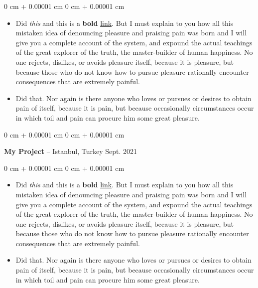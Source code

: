 \documentclass[10pt, letterpaper]{article}
\newenvironment{highlights}{
    \begin{itemize}[
        topsep=0.10 cm,
        parsep=0.10 cm,
        partopsep=0pt,
        itemsep=0pt,
        leftmargin=0 cm + 10pt
    ]
}{
    \end{itemize}
} %
\newenvironment{onecolentry}{
    \begin{adjustwidth}{
        0 cm + 0.00001 cm
    }{
        0 cm + 0.00001 cm
    }
}{
    \end{adjustwidth}
} %
\newenvironment{twocolentry}[2][]{
    \onecolentry
    \def\secondColumn{#2}
    \setcolumnwidth{\fill, 4.5 cm}
    \begin{paracol}{2}
}{
    \switchcolumn \raggedleft \secondColumn
    \end{paracol}
    \endonecolentry
} %
\begin{document}
        \vspace{0.10 cm}
        \begin{onecolentry}
            \begin{highlights}
                \item Did \textit{this} and this is a \textbf{bold} \href{https://example.com}{link}. But I must explain to you how all this mistaken idea of denouncing pleasure and praising pain was born and I will give you a complete account of the system, and expound the actual teachings of the great explorer of the truth, the master-builder of human happiness. No one rejects, dislikes, or avoids pleasure itself, because it is pleasure, but because those who do not know how to pursue pleasure rationally encounter consequences that are extremely painful.
                \item Did that. Nor again is there anyone who loves or pursues or desires to obtain pain of itself, because it is pain, but because occasionally circumstances occur in which toil and pain can procure him some great pleasure.
            \end{highlights}
        \end{onecolentry}


        \vspace{0.2 cm}

        \begin{twocolentry}{
            Sept. 2021
        }
            \textbf{My Project} -- Istanbul, Turkey\end{twocolentry}

        \vspace{0.10 cm}
        \begin{onecolentry}
            \begin{highlights}
                \item Did \textit{this} and this is a \textbf{bold} \href{https://example.com}{link}. But I must explain to you how all this mistaken idea of denouncing pleasure and praising pain was born and I will give you a complete account of the system, and expound the actual teachings of the great explorer of the truth, the master-builder of human happiness. No one rejects, dislikes, or avoids pleasure itself, because it is pleasure, but because those who do not know how to pursue pleasure rationally encounter consequences that are extremely painful.
                \item Did that. Nor again is there anyone who loves or pursues or desires to obtain pain of itself, because it is pain, but because occasionally circumstances occur in which toil and pain can procure him some great pleasure.
            \end{highlights}
        \end{onecolentry}
\end{document}
